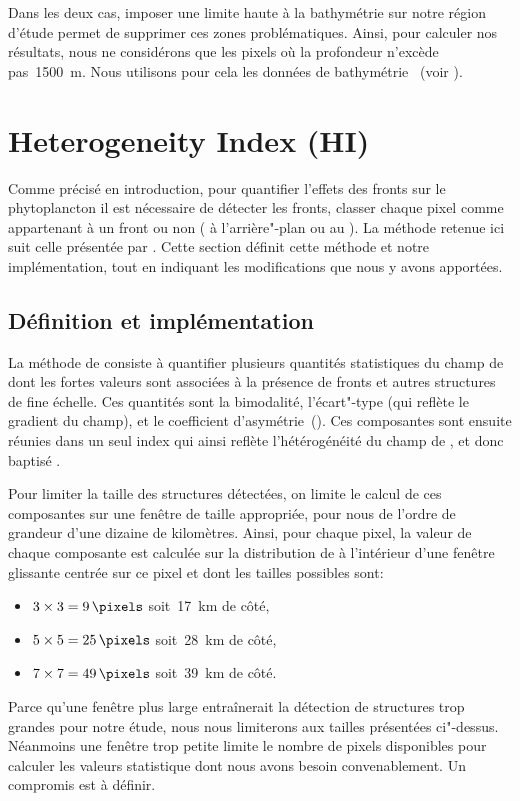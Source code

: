 Dans les deux cas, imposer une limite haute à la bathymétrie sur notre région d'étude permet de supprimer ces zones problématiques.
Ainsi, pour calculer nos résultats, nous ne considérons que les pixels où la profondeur n'excède pas~\qty{1500}{\m}.
Nous utilisons pour cela les données de bathymétrie ~(voir ).

\section{Heterogeneity Index (HI)}
\label{sec:HI}

Comme précisé en introduction, pour quantifier l'effets des fronts sur le phytoplancton il est nécessaire de détecter les fronts,  classer chaque pixel comme appartenant à un front ou non ( à l'arrière"-plan ou au ).
La méthode retenue ici suit celle présentée par \textcite{liu_2016} .
Cette section définit cette méthode et notre implémentation, tout en indiquant les modifications que nous y avons apportées.

\subsection{Définition et implémentation}
\label{sec:HI-definition}

La méthode de \textcite{liu_2016} consiste à quantifier plusieurs quantités statistiques du champ de  dont les fortes valeurs sont associées à la présence de fronts et autres structures de fine échelle.
Ces quantités sont la bimodalité, l'écart"-type (qui reflète le gradient du champ), et le coefficient d'asymétrie~().
Ces composantes sont ensuite réunies dans un seul index qui ainsi reflète l'hétérogénéité du champ de , et donc baptisé .

Pour limiter la taille des structures détectées, on limite le calcul de ces composantes sur une fenêtre de taille appropriée,  pour nous de l'ordre de grandeur d'une dizaine de kilomètres.
Ainsi, pour chaque pixel, la valeur de chaque composante est calculée sur la distribution de  à l'intérieur d'une fenêtre glissante centrée sur ce pixel et dont les tailles possibles sont:
\begin{itemize}
        \item \(3 \times 3 =\qty{9}{\pixels}\) soit~\qty{17}{\km} de côté,
        \item \(5 \times 5 =\qty{25}{\pixels}\) soit~\qty{28}{\km} de côté,
        \item \(7 \times 7 =\qty{49}{\pixels}\) soit~\qty{39}{\km} de côté.
\end{itemize}
Parce qu'une fenêtre plus large entraînerait la détection de structures trop grandes pour notre étude, nous nous limiterons aux tailles présentées ci"-dessus.
Néanmoins une fenêtre trop petite limite le nombre de pixels disponibles pour calculer les valeurs statistique dont nous avons besoin convenablement.
Un compromis est à définir.

